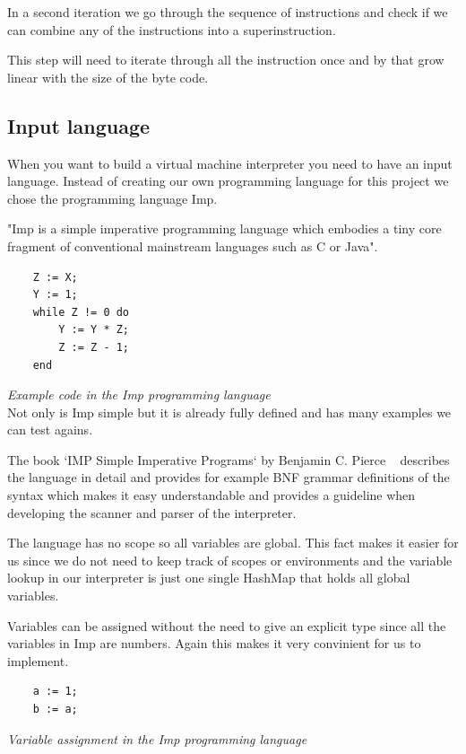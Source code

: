 \documentclass{article}
\begin{document}
In a second iteration we go through the sequence of instructions and check
if we can combine any of the instructions into a superinstruction.

This step will need to iterate through all the instruction once and by that
grow linear with the size of the byte code.

\subsection{Input language} %
\label{sec:input_language}
When you want to build a virtual machine interpreter you need to have an
input language. Instead of creating our own programming language for this
project we chose the programming language Imp. ~\cite{Pierce:SF1}

"Imp is a simple imperative programming language which embodies a tiny core
fragment of conventional mainstream languages such as C or Java". ~\cite{Pierce:SF1}

\begin{verbatim}
    Z := X;
    Y := 1;
    while Z != 0 do
        Y := Y * Z;
        Z := Z - 1;
    end
\end{verbatim}
\textit{Example code in the Imp programming language} \\

Not only is Imp simple but it is already fully defined and has many examples
we can test agains.

The book `IMP Simple Imperative Programs` by Benjamin C. Pierce
~\cite{Pierce:SF1} describes the language in detail and provides for example
BNF grammar definitions of the syntax which makes it easy understandable and
provides a guideline when developing the scanner and parser of the interpreter.

The language has no scope so all variables are global. This fact makes it easier
for us since we do not need to keep track of scopes or environments and the
variable lookup in our interpreter is just one single HashMap that holds all 
global variables.

Variables can be assigned without the need to give an explicit type since all
the variables in Imp are numbers. Again this makes it very convinient for us to
implement.

\begin{verbatim}
    a := 1;
    b := a;
\end{verbatim}
\textit{Variable assignment in the Imp programming language} \\
\end{document}
